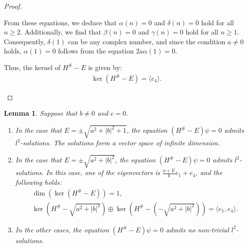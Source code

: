 \documentclass{amsart}
\newtheorem{lem}[thm]{Lemma}
\theoremstyle{definition}
\theoremstyle{remark}
\begin{document}
\begin{proof}
\begin{enumerate}
From these equations, we deduce that \(\alpha(n) = 0\) and \(\delta(n) = 0\) hold for all \(n \geq 2\). Additionally, we find that \(\beta(n) = 0\) and \(\gamma(n) = 0\) hold for all \(n \geq 1\). Consequently, \(\delta(1)\) can be any complex number, and since the condition \(a \neq 0\) holds, \(\alpha(1) = 0\) follows from the equation \(2a \alpha(1) = 0\).

Thus, the kernel of \(H^\# - E\) is given by:
\begin{align*}
\ker(H^\# - E) = \langle e_4 \rangle.
\end{align*}
\end{enumerate}
\end{proof}

\begin{lem}\label{lem:6.2}
Suppose that $b\neq 0$ and $c=0$.
\begin{enumerate}
\item In the case that $E=\pm \sqrt{a^2+|b|^2+1}$, the equation $(H^{\#}-E)\psi=0$ admits $l^2$-solutions. The solutions form a vector space of infinite dimension.

\item  In the case that $E=\pm \sqrt{a^2+|b|^2}$, the equation $(H^\#-E)\psi =0$ admits $l^2$-solutions.
In this case, one of the eigenvectors is $\frac{a+E}{b}e_{1}+e_4$, and the following holds:
\begin{align*}
&\dim(\ker(H^\#-E))=1, \\
&\ker(H^\#-\sqrt{a^2+|b|^2})\oplus \ker(H^\#-(-\sqrt{a^2+|b|^2}))=\langle e_{1},e_{4}\rangle.
\end{align*}
\item In the other cases, the equation $(H^{\#}-E)\psi =0$ admits no non-trivial $l^2$-solutions.

\end{enumerate}
\end{lem}
\end{document}
